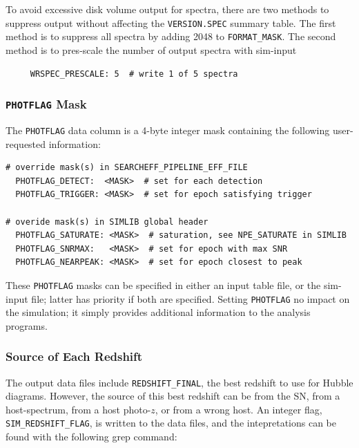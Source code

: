 \documentclass[12pt]{article}
\begin{document}
To avoid excessive disk volume output for spectra, there are two methods
to suppress output without affecting the  {\tt VERSION.SPEC} summary table.
The first method is to suppress all spectra by adding 2048 to {\tt FORMAT\_MASK}.
The second method is to pres-scale the number of output spectra with sim-input
\begin{verbatim}
     WRSPEC_PRESCALE: 5  # write 1 of 5 spectra 
\end{verbatim}

   \subsubsection{{\tt PHOTFLAG} Mask}
   \label{sss:PHOTFLAG}

The {\tt PHOTFLAG} data column is a 4-byte integer mask containing
the following user-requested information:
%
\begin{verbatim}
# override mask(s) in SEARCHEFF_PIPELINE_EFF_FILE
  PHOTFLAG_DETECT:  <MASK>  # set for each detection
  PHOTFLAG_TRIGGER: <MASK>  # set for epoch satisfying trigger

# overide mask(s) in SIMLIB global header
  PHOTFLAG_SATURATE: <MASK>  # saturation, see NPE_SATURATE in SIMLIB
  PHOTFLAG_SNRMAX:   <MASK>  # set for epoch with max SNR
  PHOTFLAG_NEARPEAK: <MASK>  # set for epoch closest to peak 
\end{verbatim}
%
These {\tt PHOTFLAG} masks can be specified in either an input
table file, or the sim-input file; latter has priority if both
are specified. Setting {\tt PHOTFLAG} no impact on the simulation;
it simply provides additional information to the analysis programs.


  \clearpage
   \subsubsection{Source of Each Redshift}
   \label{sss:redshift_flag}

The output data files include {\tt REDSHIFT\_FINAL},
the best redshift to use for Hubble diagrams.
However, the source of this best redshift can be
from the SN, from a host-spectrum, from a host photo-$z$,
or from a wrong host. An integer flag, {\tt SIM\_REDSHIFT\_FLAG},
is written to the data files, and the intepretations can be
found with the following grep command:
\end{document}
